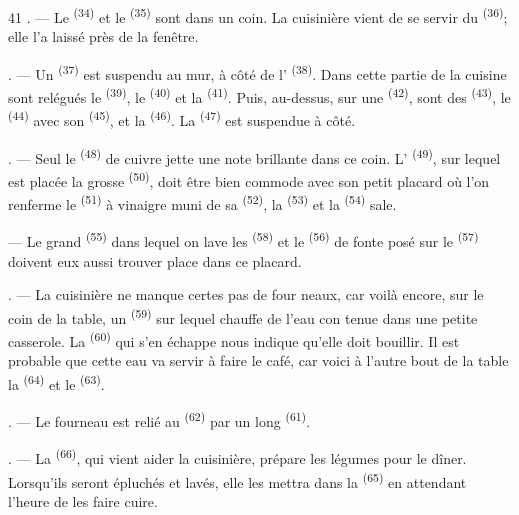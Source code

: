 \begin{VUpage}[43]{41}
. --- Le  \textsuperscript{(34)} et le  \textsuperscript{(35)} sont dans\nl
un coin. La cuisinière vient de se servir du  \textsuperscript{(36)};\nl
elle l'a laissé près de la fenêtre.

. --- Un  \textsuperscript{(37)} est suspendu au mur,\nl
à côté de l' \textsuperscript{(38)}. Dans cette partie de la\nl
cuisine sont relégués le  \textsuperscript{(39)}, le  \textsuperscript{(40)} et la\nl
{} \textsuperscript{(41)}. Puis, au-dessus, sur une\nl
{} \textsuperscript{(42)}, sont des  \textsuperscript{(43)}, le  \textsuperscript{(44)} avec\nl
son  \textsuperscript{(45)}, et la  \textsuperscript{(46)}. La  \textsuperscript{(47)}\nl
est suspendue à côté.

. --- Seul le  \textsuperscript{(48)} de cuivre jette une note\nl
brillante dans ce coin. L' \textsuperscript{(49)}, sur lequel est\nl
placée la grosse  \textsuperscript{(50)}, doit être bien commode\nl
avec son petit placard où l'on renferme le \cc
{} \textsuperscript{(51)} à vinaigre muni de sa  \textsuperscript{(52)}, la \nl
{} \textsuperscript{(53)} et la  \textsuperscript{(54)} sale.

 --- Le grand  \textsuperscript{(55)} dans lequel on lave les\nl
{} \textsuperscript{(58)} et le  \textsuperscript{(56)} de fonte posé sur\nl
le  \textsuperscript{(57)} doivent eux aussi trouver place\nl
dans ce placard.

. --- La cuisinière ne manque certes pas de four\cc
neaux, car voilà encore, sur le coin de la table, un\nl
{} \textsuperscript{(59)} sur lequel chauffe de l'eau con\cc
tenue dans une petite casserole. La  \textsuperscript{(60)} qui\nl
s'en échappe nous indique qu'elle doit bouillir. Il est\nl
probable que cette eau va servir à faire le café, car\nl
voici à l'autre bout de la table la  \textsuperscript{(64)} et le\nl
{} \textsuperscript{(63)}.

. --- Le fourneau est relié au  \textsuperscript{(62)}\nl
par un long  \textsuperscript{(61)}.

. --- La  \textsuperscript{(66)}, qui vient aider\nl
la cuisinière, prépare les légumes pour le dîner.\nl
Lorsqu'ils seront épluchés et lavés, elle les mettra\nl
dans la  \textsuperscript{(65)} en attendant l'heure de les faire\nl
cuire.
\end{VUpage}

